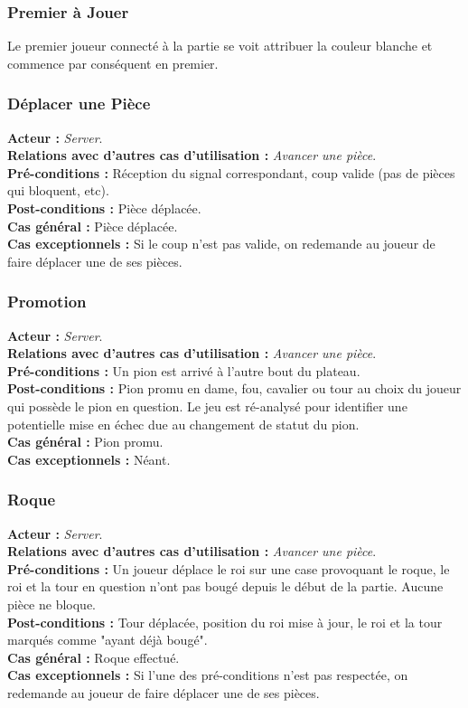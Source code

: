 \documentclass[10pt, a4paper]{article}
\begin{document}
\subsubsection{Premier à Jouer}
Le premier joueur connecté à la partie se voit attribuer la couleur blanche et commence par conséquent en premier. \\

\subsubsection{Déplacer une Pièce}
\textbf{Acteur :} \textit{Server}. \\
\textbf{Relations avec d'autres cas d'utilisation :} {\itshape Avancer une pièce}. \\
\textbf{Pré-conditions :} Réception du signal correspondant, coup valide (pas de pièces qui bloquent, etc). \\
\textbf{Post-conditions :} Pièce déplacée. \\
\textbf{Cas général :} Pièce déplacée. \\
\textbf{Cas exceptionnels :} Si le coup n'est pas valide, on redemande au joueur de faire déplacer une de ses pièces. \\

\subsubsection{Promotion}
\textbf{Acteur :} \textit{Server}. \\
\textbf{Relations avec d'autres cas d'utilisation :} {\itshape Avancer une pièce}. \\
\textbf{Pré-conditions :} Un pion est arrivé à l'autre bout du plateau. \\
\textbf{Post-conditions :} Pion promu en dame, fou, cavalier ou tour au choix du joueur qui possède le pion en question. Le jeu est ré-analysé pour identifier une potentielle mise en échec due au changement de statut du pion. \\
\textbf{Cas général :} Pion promu. \\
\textbf{Cas exceptionnels :} Néant. \\

\subsubsection{Roque}
\textbf{Acteur :} \textit{Server}. \\
\textbf{Relations avec d'autres cas d'utilisation :} {\itshape Avancer une pièce}. \\
\textbf{Pré-conditions :} Un joueur déplace le roi sur une case provoquant le roque, le roi et la tour en question n'ont pas bougé depuis le début de la partie. Aucune pièce ne bloque. \\
\textbf{Post-conditions :} Tour déplacée, position du roi mise à jour, le roi et la tour marqués comme "ayant déjà bougé". \\
\textbf{Cas général :} Roque effectué. \\
\textbf{Cas exceptionnels :} Si l'une des pré-conditions n'est pas respectée, on redemande au joueur de faire déplacer une de ses pièces. \\
\end{document}
